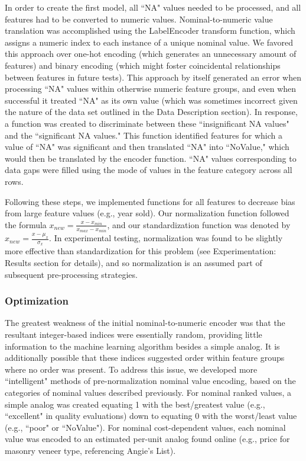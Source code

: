 \documentclass[letterpaper]{article}
\begin{document}
In order to create the first model, all ``NA" values needed to be processed, and all features had to be converted to numeric values.  Nominal-to-numeric value translation was accomplished using the LabelEncoder transform function, which assigns a numeric index to each instance of a unique nominal value.  We favored this approach over one-hot encoding (which generates an unnecessary amount of features) and binary encoding (which might foster coincidental relationships between features in future tests).  This approach by itself generated an error when processing ``NA" values within otherwise numeric feature groups, and even when successful it treated ``NA" as its own value (which was sometimes incorrect given the nature of the data set outlined in the Data Description section).  In response, a function was created to discriminate between these ``insignificant NA values" and the ``significant NA values."  This function identified features for which a value of ``NA" was significant and then translated ``NA" into ``NoValue," which would then be translated by the encoder function.  ``NA" values corresponding to data gaps were filled using the mode of values in the feature category across all rows.

Following these steps, we implemented functions for all features to decrease bias from large feature values (e.g., year sold).  Our normalization function followed the formula ${x_{new} = \frac{x - x_{min}}{x_{max} - x_{min}}}$, and our standardization function was denoted by ${x_{new} = \frac{x - \mu_{x}}{\sigma_{x}}}$.  In experimental testing, normalization was found to be slightly more effective than standardization for this problem (see Experimentation: Results section for details), and so normalization is an assumed part of subsequent pre-processing strategies.

\subsubsection{Optimization}

The greatest weakness of the initial nominal-to-numeric encoder was that the resultant integer-based indices were essentially random, providing little information to the machine learning algorithm besides a simple analog.  It is additionally possible that these indices suggested order within feature groups where no order was present.  To address this issue, we developed more ``intelligent" methods of pre-normalization nominal value encoding, based on the categories of nominal values described previously.  For nominal ranked values, a simple analog was created equating 1 with the best/greatest value (e.g., ``excellent" in quality evaluations) down to equating 0 with the worst/least value (e.g., ``poor" or ``NoValue").  For nominal cost-dependent values, each nominal value was encoded to an estimated per-unit analog found online (e.g., price for masonry veneer type, referencing Angie's List).
\end{document}
